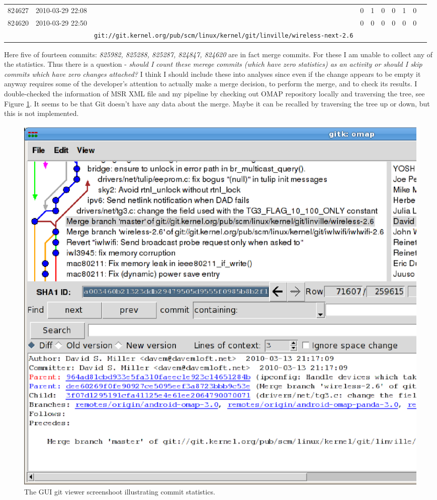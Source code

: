 \documentclass[a4paper,10pt]{article}
\numberwithin{equation}{subsection}
\begin{document}
\begin{table}[hb]
\begin{minipage}{\textwidth}
\begin{tabularx}{\textwidth}{ | l | l | X | r | r | r | r | r | r | r |}
824627 & 2010-03-29 22:08 & \verb1sparc64: Properly truncate pt_regs framepointer in perf callback.1 & 0 & 1 & 0 & 0 & 1 & 0\\ 
824620 & 2010-03-29 22:50 & \verb9Merge branch 'master' of 9 & 0 & 0 & 0 & 0 & 0 & 0\\
& & \verb+git://git.kernel.org/pub/scm/linux/kernel/git/linville/wireless-next-2.6+ &  &  &  &  &  & \\  
\hline           
  \end{tabularx}
\end{minipage}
  \label{tab:origins}
\end{table}

Here five of fourteen commits: \emph{825982, 825288, 825287, 824847, 824620} are in fact merge commits. For these
I am unable to collect any of the statistics. Thus there is a question - \textit{should I count these merege commits 
(which have zero statistics) as an activity or should I skip commits which have
zero changes attached?} I think I should include these into analyses since even if the change appears to be empty
it anyway requires some of the developer's attention to actually make a merge decision, to perform the merge, 
and to check its results. I double-checked the information of MSR XML file and my pipeline by checking out OMAP 
repository locally and traversing 
the tree, see Figure \ref{fig:git_screen}. It seems to be that Git doesn't have any data about the merge. 
Maybe it can be recalled by traversing the tree up or down, but this is not implemented.

\begin{figure}[h]
   \centering
   \includegraphics[width=\textwidth]{figures/Screenshot-gitk:omap.ps}
   \caption{The GUI git viewer screenshoot illustrating commit statistics.}
   \label{fig:git_screen}
\end{figure}
\end{document}

